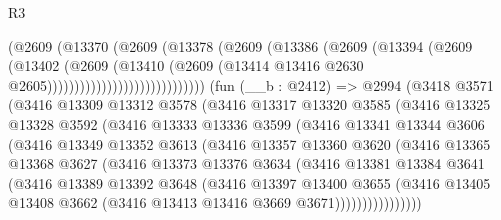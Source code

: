 \begin{lexlean}{R3}
\begin{coremodule}
                                  (@2609
                                    (@13370
                                      (@2609
                                        (@13378
                                          (@2609
                                            (@13386
                                              (@2609
                                                (@13394
                                                  (@2609
                                                    (@13402
                                                      (@2609
                                                        (@13410
                                                          (@2609
                                                            (@13414
                                                              @13416
                                                              @2630
                                                              @2605)))))))))))))))))))))))))))))
    (fun (__b : @2412) =>
    @2994
      (@3418
        @3571
        (@3416
          @13309
          @13312
          @3578
          (@3416
            @13317
            @13320
            @3585
            (@3416
              @13325
              @13328
              @3592
              (@3416
                @13333
                @13336
                @3599
                (@3416
                  @13341
                  @13344
                  @3606
                  (@3416
                    @13349
                    @13352
                    @3613
                    (@3416
                      @13357
                      @13360
                      @3620
                      (@3416
                        @13365
                        @13368
                        @3627
                        (@3416
                          @13373
                          @13376
                          @3634
                          (@3416
                            @13381
                            @13384
                            @3641
                            (@3416
                              @13389
                              @13392
                              @3648
                              (@3416
                                @13397
                                @13400
                                @3655
                                (@3416
                                  @13405
                                  @13408
                                  @3662
                                  (@3416 @13413 @13416 @3669 @3671))))))))))))))))

\end{coremodule}
\end{lexlean}
